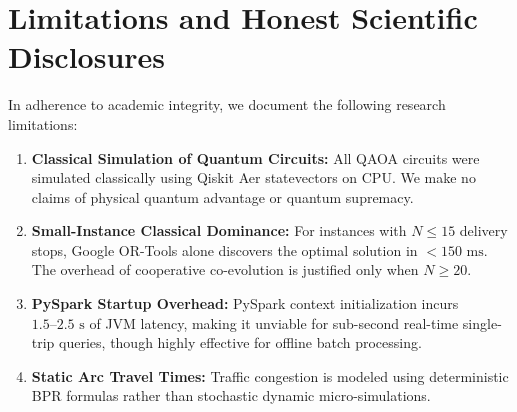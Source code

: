\section{Limitations and Honest Scientific Disclosures}
\label{sec:limitations}
In adherence to academic integrity, we document the following research limitations:
\begin{enumerate}
    \item \textbf{Classical Simulation of Quantum Circuits:} All QAOA circuits were simulated classically using Qiskit Aer statevectors on CPU. We make no claims of physical quantum advantage or quantum supremacy.
    \item \textbf{Small-Instance Classical Dominance:} For instances with $N \le 15$ delivery stops, Google OR-Tools alone discovers the optimal solution in $< 150\text{ ms}$. The overhead of cooperative co-evolution is justified only when $N \ge 20$.
    \item \textbf{PySpark Startup Overhead:} PySpark context initialization incurs $1.5\text{--}2.5\text{ s}$ of JVM latency, making it unviable for sub-second real-time single-trip queries, though highly effective for offline batch processing.
    \item \textbf{Static Arc Travel Times:} Traffic congestion is modeled using deterministic BPR formulas rather than stochastic dynamic micro-simulations.
\end{enumerate}

